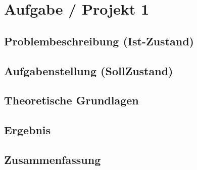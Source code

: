 \section{Aufgabe / Projekt 1}

\subsection{Problembeschreibung (Ist-Zustand)}
\subsection{Aufgabenstellung (SollZustand)}
\subsection{Theoretische Grundlagen}
\subsection{Ergebnis}
\subsection{Zusammenfassung}
